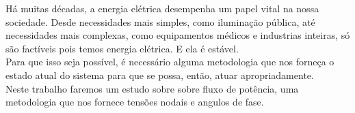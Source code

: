 \documentclass[Portugues,Final]{tese-FT}
\begin{document}
\paginasiniciais
\begin{resumo}

H\'a muitas d\'ecadas, a energia el\'etrica desempenha um papel vital na nossa sociedade. Desde necessidades mais simples, como ilumina\c{c}\~ao p\'ublica, at\'e necessidades mais complexas, como equipamentos m\'edicos e industrias inteiras, s\'o s\~ao fact\'iveis pois temos energia el\'etrica. E ela \'e est\'avel.\\
Para que isso seja poss\'ivel, \'e necess\'ario alguma metodologia que nos forne\c{c}a o estado atual do sistema para que se possa, ent\~ao, atuar apropriadamente.\\
Neste trabalho faremos um estudo sobre sobre fluxo de potência, uma metodologia que nos fornece tens\~oes nodais e angulos de fase.



\end{resumo}


%

\renewcommand{\nomname}{Lista de Abreviações e Siglas}
\printnomenclature[3cm]


\tableofcontents
\fimdaspaginasiniciais


%
%










%

%

\begin{singlespacing}
\setlength\bibitemsep{10pt}   %
\printbibliography[heading=bibintoc, %
                   title={Referências bibliográficas} %
                  ]
\end{singlespacing}


%
\end{document}
